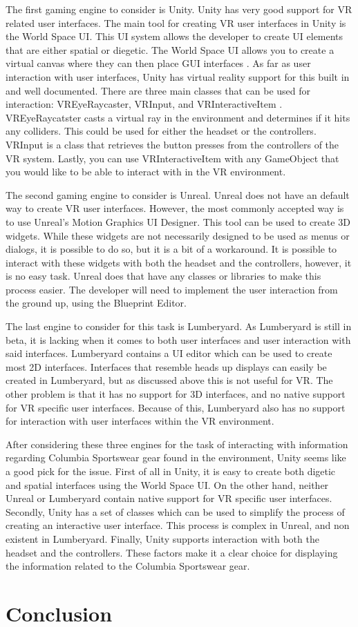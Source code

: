 \documentclass[10pt,journal,compsoc,onecolumn, draftclsnofoot]{IEEEtran}
\begin{document}
The first gaming engine to consider is Unity.
Unity has very good support for VR related user interfaces.
The main tool for creating VR user interfaces in Unity is the World Space UI.
This UI system allows the developer to create UI elements that are either spatial or diegetic.
The World Space UI allows you to create a virtual canvas where they can then place GUI interfaces \cite{unity_world_space}.
As far as user interaction with user interfaces, Unity has virtual reality support for this built in and well documented.
There are three main classes that can be used for interaction: VREyeRaycaster, VRInput, and VRInteractiveItem \cite{unity_interface_interaction}.
VREyeRaycatster casts a virtual ray in the environment and determines if it hits any colliders.
This could be used for either the headset or the controllers.
VRInput is a class that retrieves the button presses from the controllers of the VR system.
Lastly, you can use VRInteractiveItem with any GameObject that you would like to be able to interact with in the VR environment.

The second gaming engine to consider is Unreal.
Unreal does not have an default way to create VR user interfaces.
However, the most commonly accepted way is to use Unreal's Motion Graphics UI Designer.
This tool can be used to create 3D widgets.
While these widgets are not necessarily designed to be used as menus or dialogs, it is possible to do so, but it is a bit of a workaround.
It is possible to interact with these widgets with both the headset and the controllers, however, it is no easy task.
Unreal does that have any classes or libraries to make this process easier.
The developer will need to implement the user interaction from the ground up, using the Blueprint Editor.

The last engine to consider for this task is Lumberyard.
As Lumberyard is still in beta, it is lacking when it comes to both user interfaces and user interaction with said interfaces.
Lumberyard contains a UI editor which can be used to create most 2D interfaces.
Interfaces that resemble heads up displays can easily be created in Lumberyard, but as discussed above this is not useful for VR.
The other problem is that it has no support for 3D interfaces, and no native support for VR specific user interfaces.
Because of this, Lumberyard also has no support for interaction with user interfaces within the VR environment.

After considering these three engines for the task of interacting with information regarding Columbia Sportswear gear found in the environment, Unity seems like a good pick for the issue.
First of all in Unity, it is easy to create both digetic and spatial interfaces using the World Space UI.
On the other hand, neither Unreal or Lumberyard contain native support for VR specific user interfaces.
Secondly, Unity has a set of classes which can be used to simplify the process of creating an interactive user interface.
This process is complex in Unreal, and non existent in Lumberyard.
Finally, Unity supports interaction with both the headset and the controllers.
These factors make it a clear choice for displaying the information related to the Columbia Sportswear gear.

\section{Conclusion}



\end{document}
